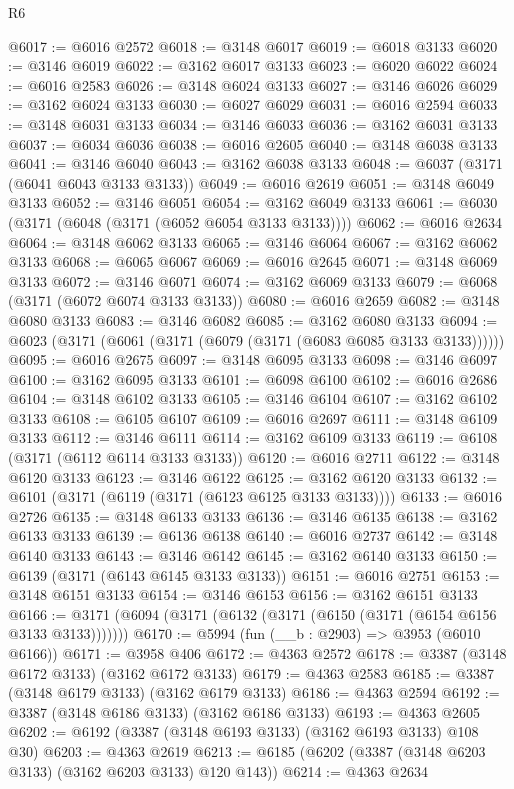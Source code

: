 \begin{lexlean}{R6}
\begin{coremodule}
@6017 := @6016 @2572
@6018 := @3148 @6017
@6019 := @6018 @3133
@6020 := @3146 @6019
@6022 := @3162 @6017 @3133
@6023 := @6020 @6022
@6024 := @6016 @2583
@6026 := @3148 @6024 @3133
@6027 := @3146 @6026
@6029 := @3162 @6024 @3133
@6030 := @6027 @6029
@6031 := @6016 @2594
@6033 := @3148 @6031 @3133
@6034 := @3146 @6033
@6036 := @3162 @6031 @3133
@6037 := @6034 @6036
@6038 := @6016 @2605
@6040 := @3148 @6038 @3133
@6041 := @3146 @6040
@6043 := @3162 @6038 @3133
@6048 := @6037 (@3171 (@6041 @6043 @3133 @3133))
@6049 := @6016 @2619
@6051 := @3148 @6049 @3133
@6052 := @3146 @6051
@6054 := @3162 @6049 @3133
@6061 := @6030 (@3171 (@6048 (@3171 (@6052 @6054 @3133 @3133))))
@6062 := @6016 @2634
@6064 := @3148 @6062 @3133
@6065 := @3146 @6064
@6067 := @3162 @6062 @3133
@6068 := @6065 @6067
@6069 := @6016 @2645
@6071 := @3148 @6069 @3133
@6072 := @3146 @6071
@6074 := @3162 @6069 @3133
@6079 := @6068 (@3171 (@6072 @6074 @3133 @3133))
@6080 := @6016 @2659
@6082 := @3148 @6080 @3133
@6083 := @3146 @6082
@6085 := @3162 @6080 @3133
@6094 := @6023 (@3171 (@6061 (@3171 (@6079 (@3171 (@6083 @6085 @3133 @3133))))))
@6095 := @6016 @2675
@6097 := @3148 @6095 @3133
@6098 := @3146 @6097
@6100 := @3162 @6095 @3133
@6101 := @6098 @6100
@6102 := @6016 @2686
@6104 := @3148 @6102 @3133
@6105 := @3146 @6104
@6107 := @3162 @6102 @3133
@6108 := @6105 @6107
@6109 := @6016 @2697
@6111 := @3148 @6109 @3133
@6112 := @3146 @6111
@6114 := @3162 @6109 @3133
@6119 := @6108 (@3171 (@6112 @6114 @3133 @3133))
@6120 := @6016 @2711
@6122 := @3148 @6120 @3133
@6123 := @3146 @6122
@6125 := @3162 @6120 @3133
@6132 := @6101 (@3171 (@6119 (@3171 (@6123 @6125 @3133 @3133))))
@6133 := @6016 @2726
@6135 := @3148 @6133 @3133
@6136 := @3146 @6135
@6138 := @3162 @6133 @3133
@6139 := @6136 @6138
@6140 := @6016 @2737
@6142 := @3148 @6140 @3133
@6143 := @3146 @6142
@6145 := @3162 @6140 @3133
@6150 := @6139 (@3171 (@6143 @6145 @3133 @3133))
@6151 := @6016 @2751
@6153 := @3148 @6151 @3133
@6154 := @3146 @6153
@6156 := @3162 @6151 @3133
@6166 := @3171 (@6094 (@3171 (@6132 (@3171 (@6150 (@3171 (@6154 @6156 @3133 @3133)))))))
@6170 := @5994 (fun (__b : @2903) => @3953 (@6010 @6166))
@6171 := @3958 @406
@6172 := @4363 @2572
@6178 := @3387 (@3148 @6172 @3133) (@3162 @6172 @3133)
@6179 := @4363 @2583
@6185 := @3387 (@3148 @6179 @3133) (@3162 @6179 @3133)
@6186 := @4363 @2594
@6192 := @3387 (@3148 @6186 @3133) (@3162 @6186 @3133)
@6193 := @4363 @2605
@6202 := @6192 (@3387 (@3148 @6193 @3133) (@3162 @6193 @3133) @108 @30)
@6203 := @4363 @2619
@6213 := @6185 (@6202 (@3387 (@3148 @6203 @3133) (@3162 @6203 @3133) @120 @143))
@6214 := @4363 @2634

\end{coremodule}
\end{lexlean}
